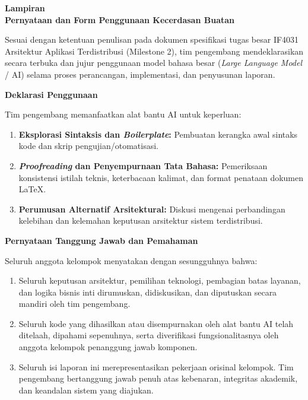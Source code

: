 \clearpage
{}
\label{chap:ai_declaration}

\begin{center}
    {\Large\bfseries Lampiran \thechapter}\\[0.3cm]
    {\Large \bfseries Pernyataan dan Form Penggunaan Kecerdasan Buatan}
\end{center}

\begin{small}
\begin{singlespacing}
\noindent Sesuai dengan ketentuan penulisan pada dokumen spesifikasi tugas besar IF4031 Arsitektur Aplikasi Terdistribusi (Milestone 2), tim pengembang mendeklarasikan secara terbuka dan jujur penggunaan model bahasa besar (\textit{Large Language Model} / AI) selama proses perancangan, implementasi, dan penyusunan laporan.

\vspace{1.2cm}
\noindent\textbf{\large Deklarasi Penggunaan}\par
\vspace{0.1cm}
\noindent Tim pengembang memanfaatkan alat bantu AI untuk keperluan:
\begin{enumerate}[noitemsep, topsep=1pt, parsep=0pt]
    \item \textbf{Eksplorasi Sintaksis dan \textit{Boilerplate}:} Pembuatan kerangka awal sintaks kode dan skrip pengujian/otomatisasi.
    \item \textbf{\textit{Proofreading} dan Penyempurnaan Tata Bahasa:} Pemeriksaan konsistensi istilah teknis, keterbacaan kalimat, dan format penataan dokumen LaTeX.
    \item \textbf{Perumusan Alternatif Arsitektural:} Diskusi mengenai perbandingan kelebihan dan kelemahan keputusan arsitektur sistem terdistribusi.
\end{enumerate}

\vspace{1.2cm}
\noindent\textbf{\large Pernyataan Tanggung Jawab dan Pemahaman}\par
\vspace{0.1cm}
\noindent Seluruh anggota kelompok menyatakan dengan sesungguhnya bahwa:
\begin{enumerate}[noitemsep, topsep=1pt, parsep=0pt]
    \item Seluruh keputusan arsitektur, pemilihan teknologi, pembagian batas layanan, dan logika bisnis inti dirumuskan, didiskusikan, dan diputuskan secara mandiri oleh tim pengembang.
    \item Seluruh kode yang dihasilkan atau disempurnakan oleh alat bantu AI telah ditelaah, dipahami sepenuhnya, serta diverifikasi fungsionalitasnya oleh anggota kelompok penanggung jawab komponen.
    \item Seluruh isi laporan ini merepresentasikan pekerjaan orisinal kelompok. Tim pengembang bertanggung jawab penuh atas kebenaran, integritas akademik, dan keandalan sistem yang diajukan.
\end{enumerate}


\end{singlespacing}
\end{small}
